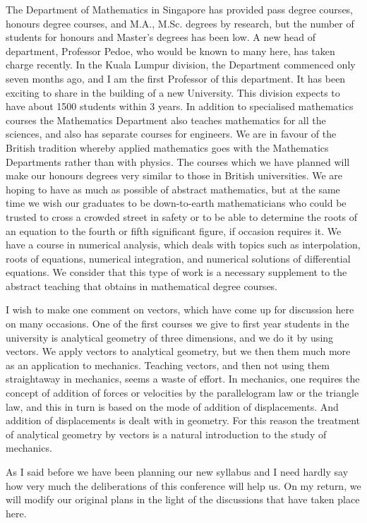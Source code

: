 The Department of Mathematics in Singapore has provided pass degree
courses, honours degree courses, and M.A., M.Sc. degrees by research,
but the number of students for honours and Master's degrees has been
low. A new head of department, Professor Pedoe, who would be known to
many here, has taken charge recently. In the Kuala Lumpur division,
the Department commenced only seven months ago, and I am the first
Professor of this department. It has been exciting to share in the
building of a new University. This division expects to have about 1500
students within 3 years. In addition to specialised mathematics
courses the Mathematics Department also teaches mathematics for all
the sciences, and also has separate courses for engineers. We are in
favour of the British tradition whereby applied mathematics goes with
the Mathematics  Departments rather than with physics. The courses
which we have planned will make our honours degrees very similar to
those in British universities. We are hoping to have as much as
possible of abstract mathematics, but at the same time we wish our
graduates to be down-to-earth mathematicians who could be trusted to
cross a crowded street in safety or to be able to determine the roots
of an equation to the fourth or fifth significant figure, if occasion
requires it. We have a course in numerical analysis, which deals with
topics such as interpolation, roots of equations, numerical
integration, and numerical solutions of differential equations. We
consider that this type of work is a necessary supplement to the
abstract teaching that obtains in mathematical degree courses. 

I wish to make one comment on vectors, which have come up for
discussion here on many occasions. One of the first courses we give to
first year students in the university is analytical geometry of three
dimensions, and we do it by using vectors. We apply vectors to
analytical geometry, but we then them much more as an application to
mechanics. Teaching vectors, and then not using them\pageoriginale
straightaway in mechanics, seems a waste of effort. In mechanics, one
requires the concept of addition of forces or velocities by the
parallelogram law or the triangle law, and this in turn is based on
the mode of addition of displacements. And addition of displacements
is dealt with in geometry. For this reason the treatment of analytical
geometry by vectors is a natural introduction to the study of
mechanics.

As I said before we have been planning our new syllabus and I need
hardly say how very much the deliberations of this conference will
help us. On my return, we will modify our original plans in the light
of the discussions that have taken place here. 

